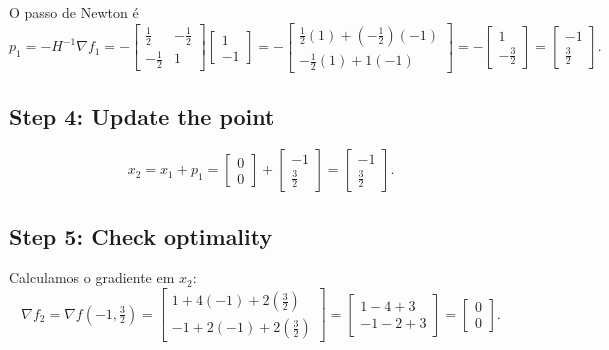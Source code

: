 \documentclass[9pt,a4paper]{extarticle}
\begin{document}
O passo de Newton é
\[
p_1 = - H^{-1} \nabla f_1
= -
\begin{bmatrix}
\frac12 & -\frac12\\[4pt]
-\frac12 & 1
\end{bmatrix}
\begin{bmatrix}
1\\
-1
\end{bmatrix}
=
-
\begin{bmatrix}
\frac12(1) + (-\frac12)(-1)\\[4pt]
-\frac12(1) + 1(-1)
\end{bmatrix}
=
-
\begin{bmatrix}
1\\[4pt]
-\tfrac32
\end{bmatrix}
=
\begin{bmatrix}
-1\\[4pt]
\tfrac32
\end{bmatrix}.
\]

\subsection*{Step 4: Update the point}

\[
x_2 = x_1 + p_1
=
\begin{bmatrix}
0\\
0
\end{bmatrix}
+
\begin{bmatrix}
-1\\[4pt]
\frac32
\end{bmatrix}
=
\begin{bmatrix}
-1\\[4pt]
\frac32
\end{bmatrix}.
\]

\subsection*{Step 5: Check optimality}

Calculamos o gradiente em $x_2$:
\[
\nabla f_2 = \nabla f(-1, \tfrac32)
=
\begin{bmatrix}
1 + 4(-1) + 2(\tfrac32)\\[4pt]
-1 + 2(-1) + 2(\tfrac32)
\end{bmatrix}
=
\begin{bmatrix}
1 - 4 + 3\\[4pt]
-1 - 2 + 3
\end{bmatrix}
=
\begin{bmatrix}
0\\[4pt]
0
\end{bmatrix}.
\]
\end{document}
